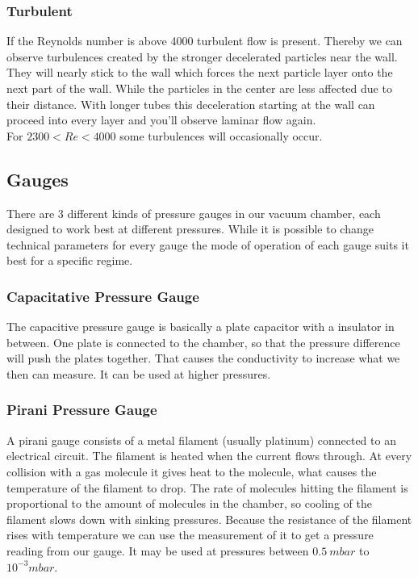 \documentclass[]{article}
\begin{document}
\subsubsection{Turbulent}
If the Reynolds number is above 4000 turbulent flow is present. Thereby we can observe turbulences created by the stronger decelerated particles near the wall. They will nearly stick to the wall which forces the next particle layer onto the next part of the wall. While the particles in the center are less affected due to their distance. With longer tubes this deceleration starting at the wall can proceed into every layer and you'll observe laminar flow again. \\
For $2300 < Re < 4000$ some turbulences will occasionally occur.


\subsection{Gauges}
There are 3 different kinds of pressure gauges in our vacuum chamber, each designed to work best at different pressures. While it is possible to change technical parameters for every gauge the mode of operation of each gauge suits it best for a specific regime.

\subsubsection[Capacitive]{Capacitative Pressure Gauge}
The capacitive pressure gauge is basically a plate capacitor with a insulator in between. One plate is connected to the chamber, so that the pressure difference will push the plates together. That causes the conductivity to increase what we then can measure. It can be used at higher pressures. 

\subsubsection[Pirani]{Pirani Pressure Gauge}
A pirani gauge consists of a metal filament (usually platinum) connected to an electrical circuit. The filament is heated when the current flows through. At every collision with a gas molecule it gives heat to the molecule, what causes the temperature of the filament to drop. The rate of molecules hitting the filament is proportional to the amount of molecules in the chamber, so cooling of the filament slows down with sinking pressures. Because the resistance of the filament rises with temperature we can use the measurement of it to get a pressure reading from our gauge. It may be used at pressures between $0.5\ mbar$ to $10^{-3}mbar$.
\end{document}
